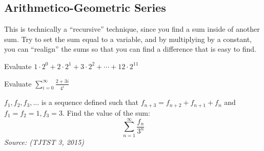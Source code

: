 	\subsection{Arithmetico-Geometric Series}
		This is technically a ``recursive'' technique, since you find a sum inside of another sum. Try to set the sum equal to a variable, and by multiplying by a constant, you can ``realign'' the sums so that you can find a difference that is easy to find.
		
		\begin{problem}
		Evaluate $1\cdot2^{0} + 2\cdot2^1 + 3\cdot2^2 +\cdots+12\cdot2^{11}$
		\end{problem}
		\begin{problem}
		Evaluate $\sum\limits_{i=0}^\infty \frac{2+3i}{4^i}$
		\end{problem}
		\begin{problem}
		$f_1, f_2, f_3, ...$ is a sequence defined such that $f_{n+3} = f_{n+2}+f_{n+1}+f_{n}$ and $f_1=f_2=1, f_3 = 3$. Find the value of the sum: 
		$$\sum\limits_{n=1}^{\infty} \frac{f_n}{3^n}$$
		\textit{Source: (TJTST 3, 2015)}
		\end{problem}

